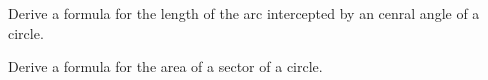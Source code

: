\begin{prob}
Derive a formula for the length of the arc intercepted by an cenral angle of a circle.  
\end{prob}

\begin{prob}
Derive a formula for the area of a sector of a circle.  
\end{prob}







